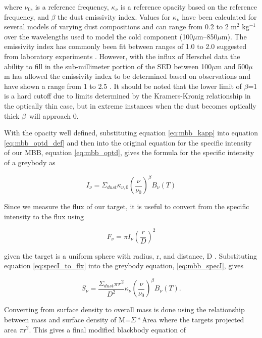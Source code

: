 \noindent where $\nu_0$, is a reference frequency, $\kappa_{\nu}$ is a reference opacity based on the reference frequency, and $\beta$ the dust emissivity index.  Values for $\kappa_\nu$ have been calculated for several models of varying dust compositions and can range from 0.2 to 2 m$^2$ kg$^{-1}$ over the wavelengths used to model the cold component (100$\mu$m--850$\mu$m)\citep{li2001}.  The emissivity index has commonly been fit between ranges of 1.0 to 2.0  suggested from laboratory experiments \citep{walcher2011}.  However, with the influx of Herschel data the ability to fill in the sub-millimeter portion of the SED between 100$\mu$m and 500$\mu$m has allowed the emissivity index to be determined based on observations and have shown a range from 1 to 2.5 \citep{galametz2012}.  It should be noted that the lower limit of $\beta$=1 is a hard cutoff due to limits determined by the Kramers-Kronig relationship in the optically thin case\citep{li2005}, but in extreme instances when the dust becomes optically thick $\beta$\ will approach 0.

With the opacity well defined, substituting equation \ref{eq:mbb_kapp} into equation \ref{eq:mbb_optd_def} and then into the original equation for the specific intensity of our MBB, equation \ref{eq:mbb_optd}, gives the formula for the specific intensity of a greybody as

\begin{equation}\label{eq:mbb_specI}
  I_\nu=\Sigma_{dust}\kappa_{\nu,0}\left(\frac{\nu}{\nu_0}\right)^\beta B_\nu\left(T\right)
\end{equation}

\noindent  Since we measure the flux of our target, it is useful to convert from the specific intensity to the flux using 

\begin{equation}\label{eq:specI_to_flx}
  F_\nu = \pi I_\nu \left(\frac{r}{D}\right)^2
\end{equation}

\noindent given the target is a uniform sphere with radius, r, and distance, D \citep{rybicki1986}.  Substituting equation \ref{eq:specI_to_flx} into the greybody equation, \ref{eq:mbb_specI}, gives

\begin{equation}\label{eq:mbb_sd}
  S_\nu=\frac{\Sigma_{dust}\pi r^2}{D^2}\kappa_\nu\left(\frac{\nu}{\nu_0}\right)^\beta B_\nu\left(T\right).
\end{equation}

Converting from surface density to overall mass is done using the relationship between mass and surface density of M=$\Sigma*$Area where the targets projected area $\pi$r$^2$.  This gives a final modified blackbody equation of 

